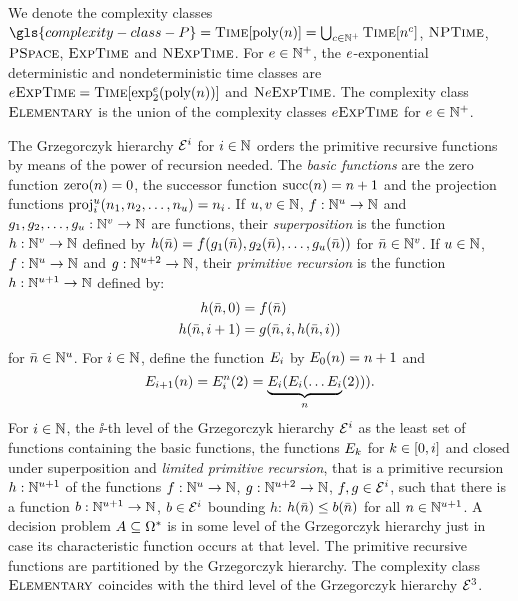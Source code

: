 We denote the complexity classes $\gls{complexity-class-P} =
\cTime{\poly\nn} = \bigcup_{c \in \pNats} \cTime{\nn^c}$,
$\text{\normalfont{\scshape NPTime}}$, $\text{\normalfont{\scshape PSpace}}$, $\text{\normalfont{\scshape ExpTime}}$ and $\text{\normalfont{\scshape NExpTime}}$.
For $e \in \mathbb{N}^{+}$, the
$e$-exponential deterministic and nondeterministic time classes are
${e\text{\normalfont{\scshape ExpTime}}} = \text{\normalfont{\scshape Time}}[\exp_{2}^{e}(\operatorname{poly}(n))]$ and $\text{\normalfont{\scshape N}}e\text{\normalfont{\scshape ExpTime}}$.
The complexity class $\text{\normalfont{\scshape Elementary}}$ is the union of the complexity classes
${e\text{\normalfont{\scshape ExpTime}}}$ for $e \in \mathbb{N}^{+}$.

The Grzegorczyk hierarchy $\mathcal{E}^{i}$ for $i\in\mathbb{N}$ orders the primitive
recursive functions by means of the power of recursion needed.
The \emph{basic functions} are
the zero function $\mathrm{zero}(n) = 0$,
the successor function $\mathrm{succ}(n) = n+1$ and
the projection functions $\mathrm{proj}_i^u(n_1,n_2,\dots,n_u) = n_i$.
If $u,v \in \mathbb{N}$, $f : \mathbb{N}^u \to \mathbb{N}$ and
$g_1,g_2,\dots,g_u : \mathbb{N}^v \to \mathbb{N}$ are functions,
their \emph{superposition} is the function $h : \mathbb{N}^v \to \mathbb{N}$
defined by $h(\bar{n}) =
  f(
  g_1(\bar{n}),
  g_2(\bar{n}), \dots,
  g_u(\bar{n}))$ for $\bar{n} \in \mathbb{N}^v$.
If $u \in \mathbb{N}$, $f : \mathbb{N}^u \to \mathbb{N}$ and
$g : \mathbb{N}^{u+2} \to \mathbb{N}$, their \emph{primitive recursion} is the
function $h : \mathbb{N}^{u+1} \to \mathbb{N}$ defined by:
\begin{align*}
h(\bar{n},0) &= f(\bar{n}) \\
h(\bar{n},i+1) &= g(\bar{n},i,h(\bar{n},i))
\end{align*}
for $\bar{n} \in \mathbb{N}^u$.
For $i \in \mathbb{N}$, define the function $E_{i}$ by $E_{0}(n) =
n+1$ and 
\[
  E_{i+1}(n) = E_{i}^n(2) =
  \underbrace{E_{i}(E_{i}(\dots E_{i}}_n(2))).
\]
For $i \in \mathbb{N}$, the $\ii$-th level of the Grzegorczyk hierarchy $\mathcal{E}^{i}$
as the least set of functions containing the basic functions, the functions
$E_{k}$ for $k \in [0,i]$ and closed under superposition and
\emph{limited primitive recursion}, that is a primitive recursion $h :
\mathbb{N}^{u+1}$ of the functions $f : \mathbb{N}^u \to \mathbb{N}$, 
$g : \mathbb{N}^{u+2} \to \mathbb{N}$, $f,g \in \mathcal{E}^{i}$, such that there is a function
$b : \mathbb{N}^{u+1} \to \mathbb{N}$,
$b \in \mathcal{E}^{i}$ bounding $h$: $h(\bar{n}) \leq b(\bar{n})$ for all $n \in
\mathbb{N}^{u+1}$. A decision problem $A \subseteq \Omega^{*}$ is in some
level of the Grzegorczyk hierarchy just in case its characteristic function
occurs at that level.
The primitive recursive functions are partitioned by the Grzegorczyk hierarchy.
The complexity class $\text{\normalfont{\scshape Elementary}}$ coincides with the third level of the
Grzegorczyk hierarchy $\mathcal{E}^{3}$.